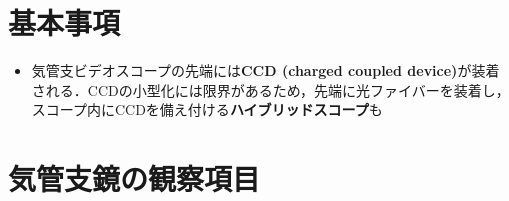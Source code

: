 


\section{基本事項}
\begin{itemize}
\item 気管支ビデオスコープの先端には\textbf{CCD (charged coupled device)}が装着される．CCDの小型化には限界があるため，先端に光ファイバーを装着し，スコープ内にCCDを備え付ける\textbf{ハイブリッドスコープ}も

\end{itemize}

\section{気管支鏡の観察項目}
